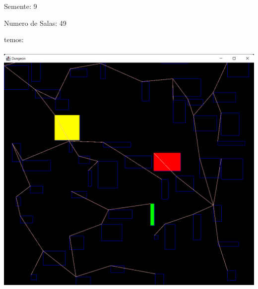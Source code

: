\documentclass[a4paper, 12pt]{article}
\begin{document}
Semente: 9

Numero de Salas: 49

temos:\\
\\
\includegraphics[width=\textwidth]{Grafo3.png}\\
\end{document}
